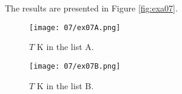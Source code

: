 \documentclass[11pt,letterpaper]{article}
\begin{document}
The results are presented in Figure \ref{fig:exa07}.
\begin{figure*}[!h]
	\centering
	\begin{subfigure}[t]{0.4\textwidth}
		\centering
		\texttt{[image: 07/ex07A.png]} 
		\caption{$T$ K in the list A.}
		\label{fig:exa07-temp1}
	\end{subfigure}
	\vspace{1cm}
	\begin{subfigure}[t]{0.4\textwidth}
		\centering
		\texttt{[image: 07/ex07B.png]} 
		\caption{$T$ K in the list B.}
		\label{fig:exa07-temp2}
	\end{subfigure}
	\hfill
	\caption{Temperature.}
	\label{fig:exa07}
\end{figure*}

%
%
%
%
%
%
%
%
\end{document}
